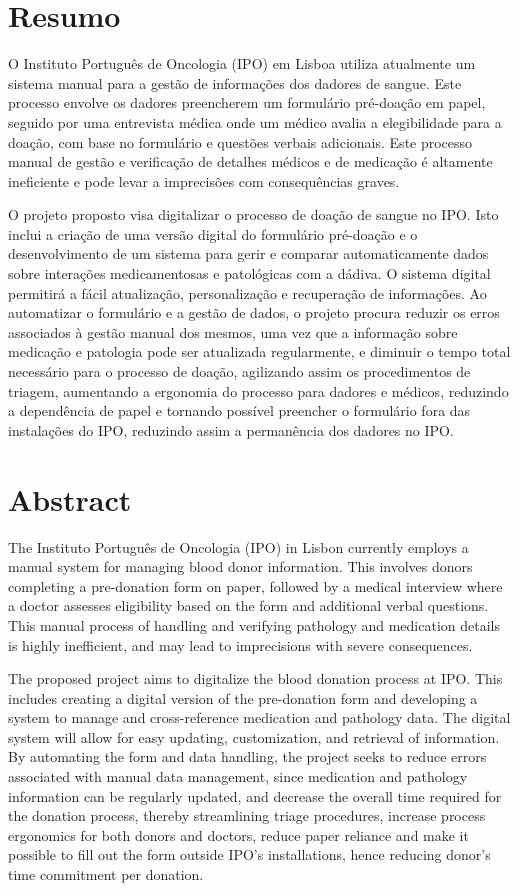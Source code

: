\documentclass[a4paper,openright,twoside,11pt]{report}
\begin{document}
\cleardoublepage
\chapter*{Resumo}
O Instituto Português de Oncologia (IPO) em Lisboa utiliza atualmente um sistema manual para a gestão de informações dos dadores de sangue. Este processo envolve os dadores preencherem um formulário pré-doação em papel, seguido por uma entrevista médica onde um médico avalia a elegibilidade para a doação, com base no formulário e questões verbais adicionais. Este processo manual de gestão e verificação de detalhes médicos e de medicação é altamente ineficiente e pode levar a imprecisões com consequências graves.

O projeto proposto visa digitalizar o processo de doação de sangue no IPO. Isto inclui a criação de uma versão digital do formulário pré-doação e o desenvolvimento de um sistema para gerir e comparar automaticamente dados sobre interações medicamentosas e patológicas com a dádiva. O sistema digital permitirá a fácil atualização, personalização e recuperação de informações. Ao automatizar o formulário e a gestão de dados, o projeto procura reduzir os erros associados à gestão manual dos mesmos, uma vez que a informação sobre medicação e patologia pode ser atualizada regularmente, e diminuir o tempo total necessário para o processo de doação, agilizando assim os procedimentos de triagem, aumentando a ergonomia do processo para dadores e médicos, reduzindo a dependência de papel e tornando possível preencher o formulário fora das instalações do IPO, reduzindo assim a permanência dos dadores no IPO.

\cleardoublepage
\chapter*{Abstract}
The Instituto Português de Oncologia (IPO) in Lisbon currently employs a manual system for managing blood donor information. This involves donors completing a pre-donation form on paper, followed by a medical interview where a doctor assesses eligibility based on the form and additional verbal questions. This manual process of handling and verifying pathology and medication details is highly inefficient, and may lead to imprecisions with severe consequences.

The proposed project aims to digitalize the blood donation process at IPO. This includes creating a digital version of the pre-donation form and developing a system to manage and cross-reference medication and pathology data. The digital system will allow for easy updating, customization, and retrieval of information. By automating the form and data handling, the project seeks to reduce errors associated with manual data management, since medication and pathology information can be regularly updated,  and decrease the overall time required for the donation process, thereby streamlining triage procedures, increase process ergonomics for both donors and doctors, reduce paper reliance and make it possible to fill out the form outside IPO's installations, hence reducing donor's time commitment per donation.
\end{document}

